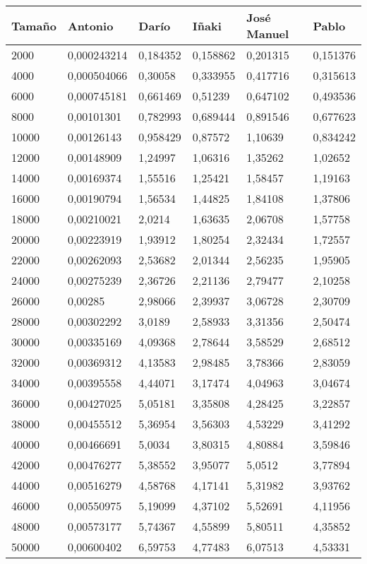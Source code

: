 \begin{tabular}{|l|l|l|l|l|l|}
	\hline
	Tamaño & Antonio & Darío & Iñaki & José Manuel & Pablo \\
	\hline
	\hline
	2000 & 0,000243214 & 0,184352 & 0,158862 & 0,201315 & 0,151376 \\
	\hline
	4000 & 0,000504066 & 0,30058 & 0,333955 & 0,417716 & 0,315613 \\
	\hline
	6000 & 0,000745181 & 0,661469 & 0,51239 & 0,647102 & 0,493536 \\
	\hline
	8000 & 0,00101301 & 0,782993 & 0,689444 & 0,891546 & 0,677623 \\
	\hline
	10000 & 0,00126143 & 0,958429 & 0,87572 & 1,10639 & 0,834242 \\
	\hline
	12000 & 0,00148909 & 1,24997 & 1,06316 & 1,35262 & 1,02652 \\
	\hline
	14000 & 0,00169374 & 1,55516 & 1,25421 & 1,58457 & 1,19163 \\
	\hline
	16000 & 0,00190794 & 1,56534 & 1,44825 & 1,84108 & 1,37806 \\
	\hline
	18000 & 0,00210021 & 2,0214 & 1,63635 & 2,06708 & 1,57758 \\
	\hline
	20000 & 0,00223919 & 1,93912 & 1,80254 & 2,32434 & 1,72557 \\
	\hline
	22000 & 0,00262093 & 2,53682 & 2,01344 & 2,56235 & 1,95905 \\
	\hline
	24000 & 0,00275239 & 2,36726 & 2,21136 & 2,79477 & 2,10258 \\
	\hline
	26000 & 0,00285 & 2,98066 & 2,39937 & 3,06728 & 2,30709 \\
	\hline
	28000 & 0,00302292 & 3,0189 & 2,58933 & 3,31356 & 2,50474 \\
	\hline
	30000 & 0,00335169 & 4,09368 & 2,78644 & 3,58529 & 2,68512 \\
	\hline
	32000 & 0,00369312 & 4,13583 & 2,98485 & 3,78366 & 2,83059 \\
	\hline
	34000 & 0,00395558 & 4,44071 & 3,17474 & 4,04963 & 3,04674 \\
	\hline
	36000 & 0,00427025 & 5,05181 & 3,35808 & 4,28425 & 3,22857 \\
	\hline
	38000 & 0,00455512 & 5,36954 & 3,56303 & 4,53229 & 3,41292 \\
	\hline
	40000 & 0,00466691 & 5,0034 & 3,80315 & 4,80884 & 3,59846 \\
	\hline
	42000 & 0,00476277 & 5,38552 & 3,95077 & 5,0512 & 3,77894 \\
	\hline
	44000 & 0,00516279 & 4,58768 & 4,17141 & 5,31982 & 3,93762 \\
	\hline
	46000 & 0,00550975 & 5,19099 & 4,37102 & 5,52691 & 4,11956 \\
	\hline
	48000 & 0,00573177 & 5,74367 & 4,55899 & 5,80511 & 4,35852 \\
	\hline
	50000 & 0,00600402 & 6,59753 & 4,77483 & 6,07513 & 4,53331 \\
	\hline
\end{tabular}

